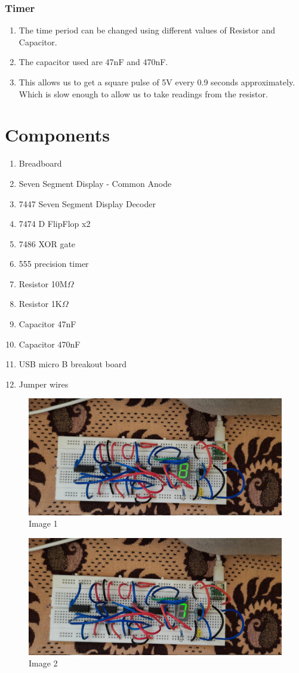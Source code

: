 \documentclass{article}
\begin{document}
\subsubsection{Timer}
\begin{enumerate}
\item The time period can be changed using different values of Resistor and Capacitor.
\item The capacitor used are 47nF and 470nF.
\item This allows us to get a square pulse of 5V every 0.9 seconds approximately. Which is slow enough to allow us to take readings from the resistor.
\end{enumerate}
\section{Components}
\begin{enumerate}
\item Breadboard
\item Seven Segment Display - Common Anode
\item 7447 Seven Segment Display Decoder
\item 7474 D FlipFlop x2
\item 7486 XOR gate
\item 555 precision timer
\item Resistor 10M$\Omega$
\item Resistor 1K$\Omega$
\item Capacitor 47nF
\item Capacitor 470nF
\item USB micro B breakout board
\item Jumper wires
\end{enumerate}
\begin{figure}[ht]
\centering
\includegraphics[width=0.7\linewidth]{figs/1.png}
\caption{Image 1}
\end{figure}
\FloatBarrier
\begin{figure}[ht]
\centering
\includegraphics[width=0.7\linewidth]{figs/2.png}
\caption{Image 2}
\end{figure}
\end{document}

